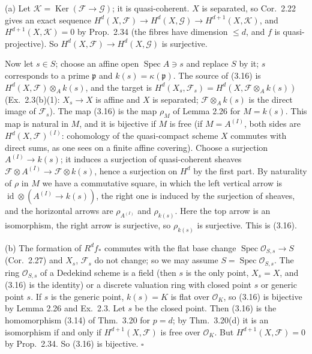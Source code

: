 \documentclass[11pt]{article}
\begin{document}
(a) Let $\mathcal K=\operatorname{Ker}(\mathcal F\to\mathcal G)$; it is quasi-coherent. $X$ is separated, so Cor.~2.22 gives an exact sequence $H^d(X,\mathcal F)\to H^d(X,\mathcal G)\to H^{d+1}(X,\mathcal K)$, and $H^{d+1}(X,\mathcal K)=0$ by Prop.~2.34 (the fibres have dimension $\le d$, and $f$ is quasi-projective). So $H^d(X,\mathcal F)\to H^d(X,\mathcal G)$ is surjective.

Now let $s\in S$; choose an affine open $\operatorname{Spec}A\ni s$ and replace $S$ by it; $s$ corresponds to a prime $\mathfrak p$ and $k(s)=\kappa(\mathfrak p)$. The source of (3.16) is $H^d(X,\mathcal F)\otimes_Ak(s)$, and the target is $H^d(X_s,\mathcal F_s)=H^d(X,\mathcal F\otimes_Ak(s))$ (Ex.~2.3(b)(1): $X_s\to X$ is affine and $X$ is separated; $\mathcal F\otimes_Ak(s)$ is the direct image of $\mathcal F_s$). The map (3.16) is the map $\rho_M$ of Lemma 2.26 for $M=k(s)$. This map is natural in $M$, and it is bijective if $M$ is free (if $M=A^{(I)}$, both sides are $H^d(X,\mathcal F)^{(I)}$: cohomology of the quasi-compact scheme $X$ commutes with direct sums, as one sees on a finite affine covering). Choose a surjection $A^{(I)}\to k(s)$; it induces a surjection of quasi-coherent sheaves $\mathcal F\otimes A^{(I)}\to\mathcal F\otimes k(s)$, hence a surjection on $H^d$ by the first part. By naturality of $\rho$ in $M$ we have a commutative square, in which the left vertical arrow is $\operatorname{id}\otimes(A^{(I)}\to k(s))$, the right one is induced by the surjection of sheaves, and the horizontal arrows are $\rho_{A^{(I)}}$ and $\rho_{k(s)}$. Here the top arrow is an isomorphism, the right arrow is surjective, so $\rho_{k(s)}$ is surjective. This is (3.16).

(b) The formation of $R^df_*$ commutes with the flat base change $\operatorname{Spec}\mathcal O_{S,s}\to S$ (Cor.~2.27) and $X_s$, $\mathcal F_s$ do not change; so we may assume $S=\operatorname{Spec}\mathcal O_{S,s}$. The ring $\mathcal O_{S,s}$ of a Dedekind scheme is a field (then $s$ is the only point, $X_s=X$, and (3.16) is the identity) or a discrete valuation ring with closed point $s$ or generic point $s$. If $s$ is the generic point, $k(s)=K$ is flat over $\mathcal O_K$, so (3.16) is bijective by Lemma 2.26 and Ex.~2.3. Let $s$ be the closed point. Then (3.16) is the homomorphism (3.14) of Thm.~3.20 for $p=d$; by Thm.~3.20(d) it is an isomorphism if and only if $H^{d+1}(X,\mathcal F)$ is free over $\mathcal O_K$. But $H^{d+1}(X,\mathcal F)=0$ by Prop.~2.34. So (3.16) is bijective. \hfill$\square$
\end{document}
